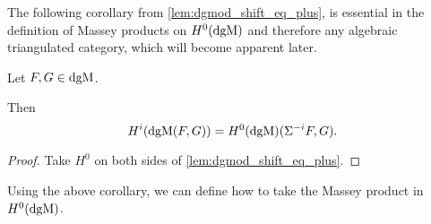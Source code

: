 The following corollary from \autoref{lem:dgmod_shift_eq_plus}, is essential in the definition of Massey products on \( H^0(\operatorname{dgM}) \) and therefore any algebraic triangulated category, which will become apparent later.

\begin{lemma}
    \label{lem:H^i_dgmod_cong_H^0_with_shift}
    Let \( F, G \in \operatorname{dgM} \).

    Then
    \[
        H^i(\operatorname{dgM}(F, G)) = H^0(\operatorname{dgM})(\Sigma^{-i} F, G).
    \]
\end{lemma}
\begin{proof}
    Take \( H^0 \) on both sides of \autoref{lem:dgmod_shift_eq_plus}.
\end{proof}

Using the above corollary, we can define how to take the Massey product in \( H^0(\operatorname{dgM}) \).


